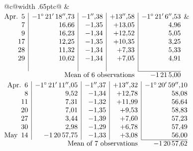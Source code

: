 \noindent\begin{tabular}{@{}c@{\hspace{.4em}\vrule width .65pt\hspace{.4em}}c@{}}
 &
 \\[.18ex]
\(\begin{array}[t]{@{}r|r|r|r|r@{}}
\text{Apr.}\enspace 5 & -1^\circ\,21'\,18''{,}73 & -1''{,}38 & +13''{,}58 & -1^\circ\,21'\,6''{,}53\\
7 & 16{,}66 & -1{,}35 & +13{,}05 & 4{,}96\\
9 & 16{,}23 & -1{,}34 & +12{,}52 & 5{,}05\\
17 & 12{,}25 & -1{,}35 & +10{,}35 & 3{,}25\\
28 & 11{,}32 & -1{,}34 & +7{,}33 & 5{,}33\\
29 & 10{,}62 & -1{,}34 & +7{,}05 & 4{,}91\\
 & & & & \\
\cline{5-5}
\multicolumn{4}{r}{\text{Mean of 6 observations}} & -1\,21\,5{,}00
\end{array}\)
&
\(\begin{array}[t]{@{}r|r|r|r|r@{}}
\text{Apr.}\enspace 6 & -1^\circ\,21'\,11''{,}05 & -1''{,}37 & +13''{,}32 & -1^\circ\,20'\,59''{,}10\\
8 & 9{,}52 & -1{,}34 & +12{,}78 & 58{,}08\\
11 & 7{,}31 & -1{,}32 & +11{,}99 & 56{,}64\\
20 & 7{,}01 & -1{,}35 & +9{,}53 & 58{,}83\\
27 & 3{,}44 & -1{,}39 & +7{,}60 & 57{,}23\\
30 & 2{,}98 & -1{,}29 & +6{,}78 & 57{,}49\\
\text{May}\enspace 14 & -1\,20\,57{,}75 & -1{,}33 & +3{,}08 & 56{,}00\\
\cline{5-5}
\multicolumn{4}{r}{\text{Mean of 7 observations}} & -1\,20\,57{,}62
\end{array}\)
\end{tabular}\par\medskip
